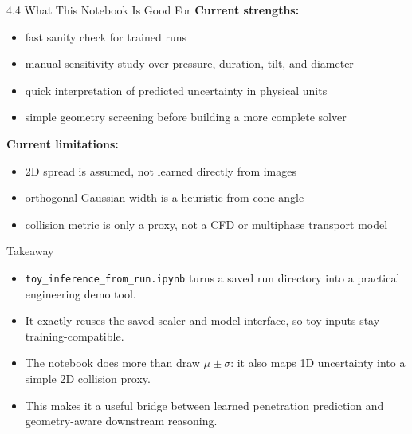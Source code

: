 \documentclass[UTF8,aspectratio=169]{ctexbeamer}
\begin{document}
\begin{frame}{4.4 What This Notebook Is Good For}
\textbf{Current strengths:}
\begin{itemize}
  \item fast sanity check for trained runs
  \item manual sensitivity study over pressure, duration, tilt, and diameter
  \item quick interpretation of predicted uncertainty in physical units
  \item simple geometry screening before building a more complete solver
\end{itemize}

\vspace{0.3em}
\textbf{Current limitations:}
\begin{itemize}
  \item 2D spread is assumed, not learned directly from images
  \item orthogonal Gaussian width is a heuristic from cone angle
  \item collision metric is only a proxy, not a CFD or multiphase transport model
\end{itemize}
\end{frame}

\begin{frame}{Takeaway}
\begin{itemize}
  \item \texttt{toy\_inference\_from\_run.ipynb} turns a saved run directory into a practical engineering demo tool.
  \item It exactly reuses the saved scaler and model interface, so toy inputs stay training-compatible.
  \item The notebook does more than draw $\mu \pm \sigma$: it also maps 1D uncertainty into a simple 2D collision proxy.
  \item This makes it a useful bridge between learned penetration prediction and geometry-aware downstream reasoning.
\end{itemize}
\end{frame}
\end{document}
